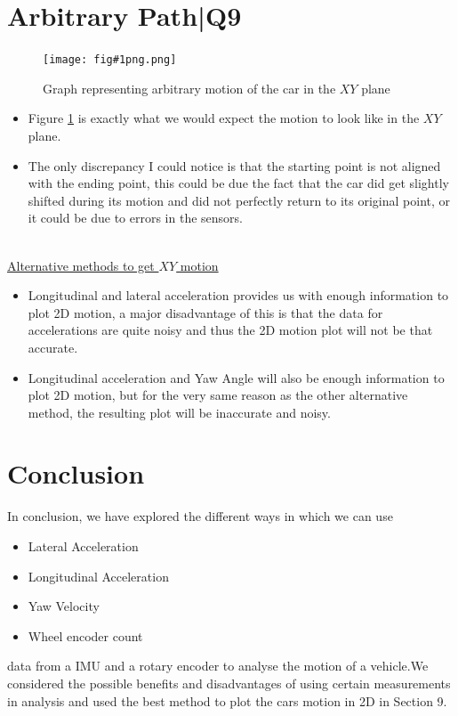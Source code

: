 \documentclass{article}
\newcommand{\main}[4]{
    \section{#2}
    
    \begin{figure}[h]
        \begin{center}
        \texttt{[image: fig\#1png.png]} 
         \caption{#3}
        \label{fig:#1}      
        \end{center}
    
    \end{figure}
    
    #4
    \newpage
}
\newcommand{\bul}[1]{\begin{itemize}
    #1
\end{itemize}}
\begin{document}
\main{9}{Arbitrary Path|Q9}{Graph representing arbitrary motion of the car in the $XY$ plane}{
\bul{
\item Figure \ref{fig:9} is exactly what we would expect the motion to look like in the $XY$ plane.\item The only discrepancy I could notice is that the starting point is not aligned with the ending point, this could be due the fact that the car did get slightly shifted during its motion and did not perfectly return to its original point, or it could be due to errors in the sensors.
}
\\
\underline{Alternative methods to get $XY$ motion }
\bul{
\item Longitudinal and lateral acceleration provides us with enough information to plot 2D motion, a major disadvantage of this is that the data for accelerations are quite noisy and thus the 2D motion plot will not be that accurate.
\item Longitudinal acceleration and Yaw Angle will also be enough information to plot 2D motion, but for the very same reason as the other alternative method, the resulting plot will be inaccurate and noisy.
}
}
\section{Conclusion}
In conclusion, we have explored the different ways in which we can use
\bul{
\item Lateral Acceleration
\item Longitudinal Acceleration
\item Yaw Velocity
\item Wheel encoder count

}
data from a IMU and a rotary encoder to analyse the motion of a vehicle.We considered the possible benefits and disadvantages of using certain measurements in analysis and used the best method to plot the cars motion in 2D in Section 9.
\end{document}

